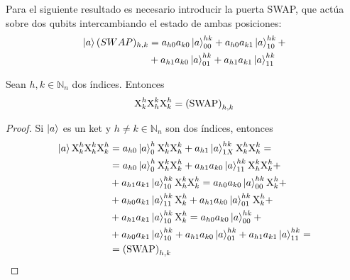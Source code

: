 Para el siguiente resultado es necesario introducir la puerta SWAP, que actúa sobre dos qubits intercambiando el estado de ambas posiciones:
\begin{align}
  \label{eq:swap}
  \begin{split}
    \ket{a}(SWAP)_{h,k} & =a_{h0}a_{k0}\ket{a}^{hk}_{00}+a_{h0}a_{k1}\ket{a}^{hk}_{10}+ \\
                        & +a_{h1}a_{k0}\ket{a}^{hk}_{01}+a_{h1}a_{k1}\ket{a}^{hk}_{11}
  \end{split}
\end{align}
\begin{proposition}
  Sean $h,k \in \mathbb{N}_n$ dos índices.
  Entonces
  \begin{equation}
    \text{X}^{h}_{k}\text{X}^{k}_{h}\text{X}^{h}_{k} = \text{(SWAP)}^{}_{h,k}
  \end{equation}
\end{proposition}
\begin{proof}
  Si $\ket{a}$ es un ket y $h\neq k \in \mathbb{N}_n$ son dos índices, entonces
  \begin{align*}
    \ket{a}\text{X}^{h}_{k}\text{X}^{k}_{h}\text{X}^{h}_{k}
     & =a_{h0}\ket{a}^{h}_{0}\text{X}^{h}_{k}\text{X}^{k}_{h}+
    a_{h1}\ket{a}^{hk}_{1X}\text{X}^{h}_{k}\text{X}^{k}_{h}=                   \\
     & =a_{h0}\ket{a}^{h}_{0}\text{X}^{k}_{h}\text{X}^{h}_{k}+
    a_{h1}a_{k0}\ket{a}^{hk}_{11}\text{X}^{k}_{h}\text{X}^{h}_{k}+        \\
     & +a_{h1}a_{k1}\ket{a}^{hk}_{10}\text{X}^{k}_{h}\text{X}^{h}_{k}
    =a_{h0}a_{k0}\ket{a}^{hk}_{00}\text{X}^{h}_{k}+                          \\
     & +a_{h0}a_{k1}\ket{a}^{hk}_{11}\text{X}^{h}_{k}
    +a_{h1}a_{k0}\ket{a}^{hk}_{01}\text{X}^{h}_{k}+                          \\
     & +a_{h1}a_{k1}\ket{a}^{hk}_{10}\text{X}^{h}_{k}
    =a_{h0}a_{k0}\ket{a}^{hk}_{00}+                                             \\
     & +a_{h0}a_{k1}\ket{a}^{hk}_{10}
    +a_{h1}a_{k0}\ket{a}^{hk}_{01}+ a_{h1}a_{k1}\ket{a}^{hk}_{11}= \\
     & =\text{(SWAP)}^{}_{h,k}
  \end{align*}
\end{proof}

